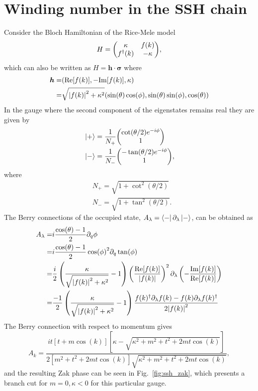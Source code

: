 \documentclass[twocolumn,amsmath,longbibliography,amssymb,superscriptaddress]{revtex4-1}
\begin{document}
\section{Winding number in the SSH chain}
\label{appendix:winding_ssh}


Consider the Bloch Hamiltonian of the Rice-Mele model
\begin{equation}
H=\mqty(\kappa & f(k) \\ f^\dagger(k) & -\kappa),
\end{equation}
which can also be written as $H = \boldsymbol{h}\cdot \boldsymbol{\sigma}$
where 
\begin{align*}
\boldsymbol{h}=& ({\rm Re}[f(k)],-{\rm Im}[f(k)],\kappa) \\
=& \sqrt{\abs{f(k)}^2 +\kappa^2}(\sin(\theta)\cos(\phi),\sin(\theta)\sin(\phi),\cos(\theta))
\end{align*}
In the gauge where the second component of the eigenstates remains real they are given by
\begin{align}
&\ket{+}  = \frac{1}{N_+}\mqty(\cot(\theta/2)e^{-i\phi}\\ 1 )\\
&\ket{-}  =\frac{1}{N_-} \mqty(-\tan(\theta/2)e^{-i\phi}\\ 1),
\end{align}
where
\begin{align*}
&N_+ = \sqrt{1+\cot^2(\theta/2)} \\
&N_- = \sqrt{1+\tan^2(\theta/2)} .
\end{align*}
The Berry connections of the occupied state, $A_\lambda = \bra{-}\partial_\lambda \ket{-}$, can be obtained as
\begin{align*}
A_{\lambda}=& i\frac{\cos(\theta)-1}{2}\partial_q \phi \\
=&i\frac{\cos(\theta)-1}{2} \cos(\phi)^2 \partial_q  \tan(\phi) \\
=&\frac{i}{2}\left(\frac{\kappa}{\sqrt{\abs{f(k)}^2+\kappa^2}}-1\right) \left( \frac{\Re [f(k)]}{\abs{f(k)}}\right)^2 \partial_\lambda  \left( -\frac{\Im [f(k)]}{\Re [f(k)]} \right) \\
=&\frac{-1}{2}\left(\frac{\kappa}{\sqrt{\abs{f(k)}^2+\kappa^2}}-1\right) \frac{f(k)^\dagger \partial_\lambda f(k)-f(k)\partial_\lambda f(k)^\dagger}{2\abs{f(k)}^2}
\end{align*}
The Berry connection with respect to momentum gives
\begin{equation}
A_k = \frac{it [t+m \cos(k)][\kappa - \sqrt{\kappa^2+m^2+t^2+2mt \cos(k)}]}{2[m^2+t^2+2mt\cos(k)]\sqrt{\kappa^2+m^2+t^2+2mt \cos(k)}},
\end{equation}
and the resulting Zak phase can be seen in Fig.~\ref{fig:ssh_zak}, which presents a branch cut for $m=0,\kappa<0$ for this particular gauge.
\end{document}
